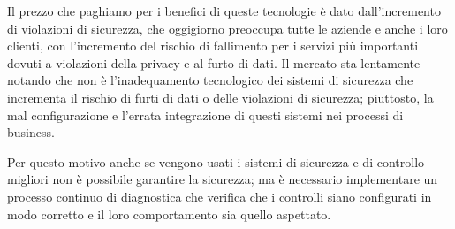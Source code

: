 Il prezzo che paghiamo per i benefici di queste tecnologie è dato dall'incremento di violazioni di sicurezza, che oggigiorno 
preoccupa tutte le aziende e anche i loro clienti, con l'incremento del rischio di fallimento per i servizi più importanti dovuti a
violazioni della privacy e al furto di dati.
\newline
Il mercato sta lentamente notando che non è l'inadequamento tecnologico dei sistemi di sicurezza che incrementa il rischio di furti 
di dati o delle violazioni di sicurezza; piuttosto, la mal configurazione e l'errata integrazione di questi sistemi nei processi 
di business. \cite{cloud-Platform-for-ICT-Security-Governance}

Per questo motivo anche se vengono usati i sistemi di sicurezza e di controllo migliori non è possibile garantire la sicurezza; 
ma è necessario implementare un processo continuo di diagnostica che verifica che i controlli siano configurati in modo corretto 
e il loro comportamento sia quello aspettato.

